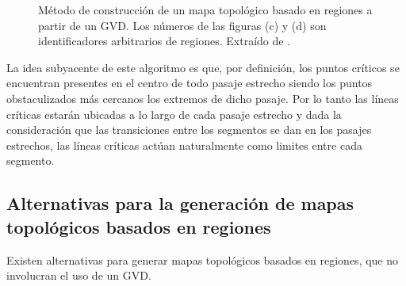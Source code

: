 \begin{figure}[H]
  \caption[Método de construcción de un mapa topológico basado en regiones a partir de un GVD.]{Método de construcción de un mapa topológico basado en regiones a partir de un GVD. Los números de las figuras (c) y (d) son identificadores arbitrarios de regiones. Extraído de \cite{Thrun1998}.}\label{fig:ejThrunTop}
\end{figure}

La idea subyacente de este algoritmo es que, por definición, los puntos críticos se encuentran presentes en el centro de todo pasaje estrecho siendo los puntos obstaculizados más cercanos los extremos de dicho pasaje. Por lo tanto las líneas críticas estarán ubicadas a lo largo de cada pasaje estrecho y dada la consideración que las transiciones entre los segmentos se dan en los pasajes estrechos, las líneas críticas actúan naturalmente como limites entre cada segmento.



\subsection[Alternativas para la generación de mapas topológicos basados en regiones]{Alternativas para la generación de mapas topológicos basados en regiones}\label{subsec:mapaTopAlt}

Existen alternativas para generar mapas topológicos basados en regiones, que no
involucran el uso de un GVD.

